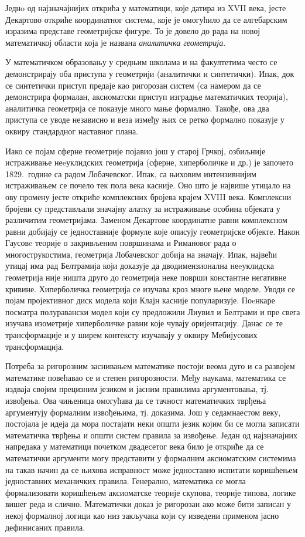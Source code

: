 Једнo од најзначајнијих открића у математици, које датира из XVII
века, јесте Декартово откриће координатног система, које је омогућило
да се алгебарским изразима представе геометријске фигуре. То је довело
до рада на новој математичкој области која је названа \emph{аналитичка
  геометрија}.

У математичком образовању у средњим школама и на факултетима често се
демонстрирају оба приступа у геометрији (аналитички и
синтетички). Ипак, док се синтетички приступ предаје као ригорозан
систем (са намером да се демонстрира формалан, аксиоматски приступ
изградње математичких теорија), аналитичка геометрија се показује
много мање формално.  Такође, ова два приступа се уводе независно и
веза између њих се ретко формално показује у оквиру стандардног
наставног плана.

Иако се појам сферне геометрије појавио још у старој Грчкој, озбиљније
истраживање неeуклидских геометрија (сферне, хиперболичке и др.) је
започето 1829.~године са радом Лобачевског. Ипак, са њиховим
интензивнијим истраживањем се почело тек пола века касније. Оно што је
највише утицало на ову промену јесте откриће комплексних бројева
крајем XVIII века. Комплексни бројеви су представљали значајну алатку
за истраживање особина објеката у различитим геометријама. Заменом
Декартове координатне равни комплексном равни добијају се
је\-дно\-став\-ни\-је формуле које описују геометријске објекте. Након
Гаусовe теорије о закривљеним површинама и Римановог рада о
многострукостима, геометрија Лобачевског добија на значају. Ипак,
највећи утицај има рад Белтрамија који доказује да дводимензионална
неeуклидска геометрија није ништа друго до геометрија неке површи
константне негативне кривине. Хиперболичка геометрија се изучава кроз
многе њене моделе. Уводи се појам пројективног диск модела који Клајн
касније популаризује. Поeнкаре посматра полуравански модел који су
предложили Лиувил и Белтрами и пре свега изучава изометрије
хиперболичке равни које чувају оријентацију. Данас се те
трансформације и у ширем контексту изучавају у оквиру Мебијусових
трансформација.


Потреба за ригорозним заснивањем математике постоји веома дуго и са
развојем ма\-те\-ма\-ти\-ке повећавао се и степен ригорозности. Међу
наукама, математика се издваја својим прецизним језиком и јасним
правилима аргументовања, тј. извођења. Ова чињеница омогућава да се
тачност ма\-те\-ма\-ти\-чких тврђења аргументују формалним извођењима,
тј. доказима. Још у седамнаестом веку, постојала је идеја да мора
постајати неки општи језик којим би се могла записати
ма\-те\-ма\-ти\-чка тврђења и општи систем правила за извођење. Један
од најзначајних напредака у математици почетком двадесетог века било је
откриће да се математички аргументи могу представити у формалним
аксиоматским системима на такав начин да се њихова исправност може
једноставно испитати коришћењем једноставних механичких
правила. Генерално, математика се могла формализовати коришћењем
аксиоматске теорије скупова, теорије ти\-по\-ва, логике вишег реда и
слично. Математички доказ је ригорозан ако може бити записан у некој
формалној логици као низ закључака који су изведени применом јасно
дефинисаних правила.

